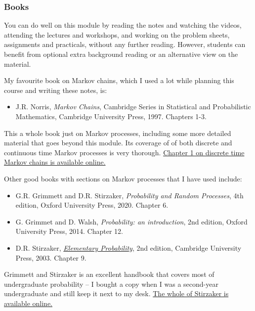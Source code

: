 \documentclass[
  a4paper,
]{article}
\providecommand{\tightlist}{%
  \setlength{\itemsep}{0pt}\setlength{\parskip}{0pt}}
\theoremstyle{definition}
\theoremstyle{definition}
\theoremstyle{definition}
\theoremstyle{remark}
\begin{document}
\hypertarget{books}{%
\subsubsection*{Books}\label{books}}

You can do well on this module by reading the notes and watching the videos, attending the lectures and workshops, and working on the problem sheets, assignments and practicals, without any further reading. However, students can benefit from optional extra background reading or an alternative view on the material.

My favourite book on Markov chains, which I used a lot while planning this course and writing these notes, is:

\begin{itemize}
\tightlist
\item
  J.R. Norris, \emph{Markov Chains}, Cambridge Series in Statistical and Probabilistic Mathematics, Cambridge University Press, 1997. Chapters 1-3.
\end{itemize}

This a whole book just on Markov processes, including some more detailed material that goes beyond this module. Its coverage of of both discrete and continuous time Markov processes is very thorough. \href{http://www.statslab.cam.ac.uk/~james/Markov/}{Chapter 1 on discrete time Markov chains is available online.}

Other good books with sections on Markov processes that I have used include:

\begin{itemize}
\tightlist
\item
  G.R. Grimmett and D.R. Stirzaker, \emph{Probability and Random Processes}, 4th edition, Oxford University Press, 2020. Chapter 6.
\item
  G. Grimmet and D. Walsh, \emph{Probability: an introduction}, 2nd edition, Oxford University Press, 2014. Chapter 12.
\item
  D.R. Stirzaker, \href{https://leeds.primo.exlibrisgroup.com/permalink/44LEE_INST/13rlbcs/alma991013131349705181}{\emph{Elementary Probability}}, 2nd edition, Cambridge University Press, 2003. Chapter 9.
\end{itemize}

Grimmett and Stirzaker is an excellent handbook that covers most of undergraduate probability -- I bought a copy when I was a second-year undergraduate and still keep it next to my desk.
\href{https://leeds.primo.exlibrisgroup.com/permalink/44LEE_INST/13rlbcs/alma991013131349705181}{The whole of Stirzaker is available online.}
\end{document}
